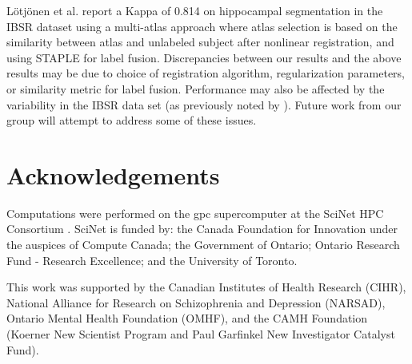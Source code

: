 \documentclass{article}\usepackage{graphicx, color}
\begin{document}
L\"{o}tj\"{o}nen et al. \citep{Lotjonen2010} report a Kappa of 0.814 on
hippocampal segmentation in the IBSR dataset using a multi-atlas approach where
atlas selection is based on the similarity between atlas and unlabeled subject
after nonlinear registration, and using STAPLE \citep{Warfield2004} for label
fusion.  Discrepancies between our results and the above results may be due to
choice of registration algorithm, regularization parameters, or similarity
metric for label fusion.  Performance may also be affected by the variability
in the IBSR data set (as previously noted by \citep{Klein2009}).  Future work
from our group will attempt to address some of these issues.

\section{Acknowledgements}
Computations were performed on the gpc supercomputer at the SciNet HPC
Consortium \citep{Loken2010}. SciNet is funded by: the Canada Foundation for
Innovation under the auspices of Compute Canada; the Government of Ontario;
Ontario Research Fund - Research Excellence; and the University of Toronto.

This work was supported by the Canadian Institutes of Health Research (CIHR),
National Alliance for Research on Schizophrenia and Depression (NARSAD),
Ontario Mental Health Foundation (OMHF), and the CAMH Foundation (Koerner New
Scientist Program and Paul Garfinkel New Investigator Catalyst Fund).


\end{document}
